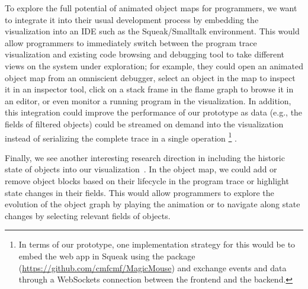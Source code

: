 To explore the full potential of animated object maps for programmers, we want to integrate it into their usual development process by embedding the visualization into an IDE such as the Squeak/Smalltalk environment.
This would allow programmers to immediately switch between the program trace visualization and existing code browsing and debugging tool to take different views on the system under exploration; for example, they could open an animated object map from an omniscient debugger, select an object in the map to inspect it in an inspector tool, click on a stack frame in the flame graph to browse it in an editor, or even monitor a running program in the visualization.
In addition, this integration could improve the performance of our prototype as data (e.g., the fields of filtered objects) could be streamed on demand into the visualization instead of serializing the complete trace in a single operation%
\footnote{In terms of our \tfd{} prototype, one implementation strategy for this would be to embed the web app in Squeak using the  package (\url{https://github.com/cmfcmf/MagicMouse}) and exchange events and data through a WebSockets connection between the frontend and the backend.}%
.

Finally, we see another interesting research direction in including the historic state of objects into our visualization~\cite{thiede2023object,thiede2023time}.
In the object map, we could add or remove object blocks based on their lifecycle in the program trace or highlight state changes in their fields.
This would allow programmers to explore the evolution of the object graph by playing the animation or to navigate along state changes by selecting relevant fields of objects.
